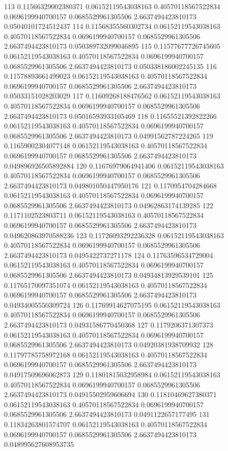 {113 0.11566329002380371 0.06152119543038163 0.40570118567522834 0.0696199940700157 0.0685529961305506 2.6637494423810173 0.05040101724512437
114 0.11568355560302734 0.06152119543038163 0.40570118567522834 0.0696199940700157 0.0685529961305506 2.6637494423810173 0.050389732099046895
115 0.11577677726745605 0.06152119543038163 0.40570118567522834 0.0696199940700157 0.0685529961305506 2.6637494423810173 0.050338186002245135
116 0.11578893661499023 0.06152119543038163 0.40570118567522834 0.0696199940700157 0.0685529961305506 2.6637494423810173 0.05033151028203029
117 0.11609268188476562 0.06152119543038163 0.40570118567522834 0.0696199940700157 0.0685529961305506 2.6637494423810173 0.05016593933105469
118 0.11655521392822266 0.06152119543038163 0.40570118567522834 0.0696199940700157 0.0685529961305506 2.6637494423810173 0.04991562787224265
119 0.11659002304077148 0.06152119543038163 0.40570118567522834 0.0696199940700157 0.0685529961305506 2.6637494423810173 0.049896926505892884
120 0.11676979064941406 0.06152119543038163 0.40570118567522834 0.0696199940700157 0.0685529961305506 2.6637494423810173 0.049801050447950176
121 0.1170954704284668 0.06152119543038163 0.40570118567522834 0.0696199940700157 0.0685529961305506 2.6637494423810173 0.04962863174139285
122 0.1171102523803711 0.06152119543038163 0.40570118567522834 0.0696199940700157 0.0685529961305506 2.6637494423810173 0.049620863970588236
123 0.11726093292236328 0.06152119543038163 0.40570118567522834 0.0696199940700157 0.0685529961305506 2.6637494423810173 0.0495422737271178
124 0.11763596534729004 0.06152119543038163 0.40570118567522834 0.0696199940700157 0.0685529961305506 2.6637494423810173 0.04934813929539101
125 0.11765170097351074 0.06152119543038163 0.40570118567522834 0.0696199940700157 0.0685529961305506 2.6637494423810173 0.04934005550309724
126 0.11769914627075195 0.06152119543038163 0.40570118567522834 0.0696199940700157 0.0685529961305506 2.6637494423810173 0.04931586770450368
127 0.1179206371307373 0.06152119543038163 0.40570118567522834 0.0696199940700157 0.0685529961305506 2.6637494423810173 0.04920381938709932
128 0.11797785758972168 0.06152119543038163 0.40570118567522834 0.0696199940700157 0.0685529961305506 2.6637494423810173 0.04917509696062873
129 0.11801815032958984 0.06152119543038163 0.40570118567522834 0.0696199940700157 0.0685529961305506 2.6637494423810173 0.04915502959606694
130 0.11810469627380371 0.06152119543038163 0.40570118567522834 0.0696199940700157 0.0685529961305506 2.6637494423810173 0.0491122657177495
131 0.11834263801574707 0.06152119543038163 0.40570118567522834 0.0696199940700157 0.0685529961305506 2.6637494423810173 0.048995627608953735
}
